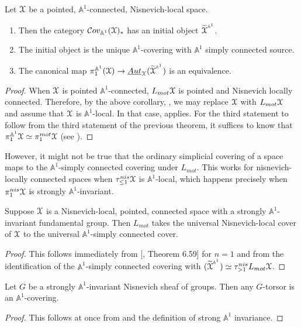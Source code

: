 \begin{thm}\label{a1 simply connected covering space}
Let $\EuScript{X}$ be a pointed, $\mathbb{A}^1$-connected, Nisnevich-local space. 
\begin{enumerate}
    \item Then the category $\mathcal{C}ov_{\mathbb{A}^1}(\EuScript{X})_*$ has an initial object $\widetilde{{\EuScript{X}}}^{^{\mathbb{A}^1}}$. 
    \item The initial object is the unique $\mathbb{A}^1$-covering with $\mathbb{A}^1$ simply connected source.
    \item   The canonical map $ \pi_1^{\mathbb{A}^1}(\EuScript{X})\to \underline{Aut}_{\EuScript{X}}(\widetilde{{\EuScript{X}}}^{^{\mathbb{A}^1}})$ is an equivalence.
\end{enumerate}
\end{thm}
\begin{proof}
When $\EuScript{X}$ is pointed $\mathbb{A}^1$-connected, $L_{mot}\EuScript{X}$ is pointed and Nisnevich locally connected. Therefore, by the above corollary, , we may replace $\EuScript{X}$ with $L_{mot}\EuScript{X}$ and assume that $\EuScript{X}$ is $\mathbb{A}^1$-local. In that case,  applies. For the third statement to follow from the third statement of the previous theorem, it suffices to know that $\pi_1^{\mathbb{A}^1}\EuScript{X}\simeq \pi_1^{mot}\EuScript{X}$ (see ).
\end{proof}
However, it might not be true that the ordinary simplicial covering of a space maps to the $\mathbb{A}^1$-simply connected covering under $L_{mot}$. This works for nisnevich-locally connected spaces when $\tau^{nis}_{\leq 1}\EuScript{X}$ is $\mathbb{A}^1$-local, which happens precisely when $\pi_1^{nis}\EuScript{X}$ is strongly $\mathbb{A}^1$-invariant.
\begin{prop}
Suppose $\EuScript{X}$ is a Nisnevich-local, pointed, connected space with a strongly $\mathbb{A}^1$-invariant fundamental group. Then $L_{mot}$ takes the universal Nisnevich-local cover of $\EuScript{X}$ to the universal $\mathbb{A}^1$-simply connected cover.
\end{prop}
\begin{proof}
    This follows immediately from [\cite{morel2012a1}, Theorem 6.59] for $n=1$ and from the identification of the $\mathbb{A}^1$-simply connected covering with $(\widetilde{{\EuScript{X}}}^{^{\mathbb{A}^1}})\simeq \tau_{>1}^{nis}L_{mot}\EuScript{X}$.
\end{proof}
\begin{cor}
Let $G$ be a strongly $\mathbb{A}^1$-invariant Nisnevich sheaf of groups. Then any $G$-torsor is an $\mathbb{A}^1$-covering. 
\end{cor}
\begin{proof}
    This follows at once from  and the definition of strong $\mathbb{A}^1$ invariance.
\end{proof}
 

